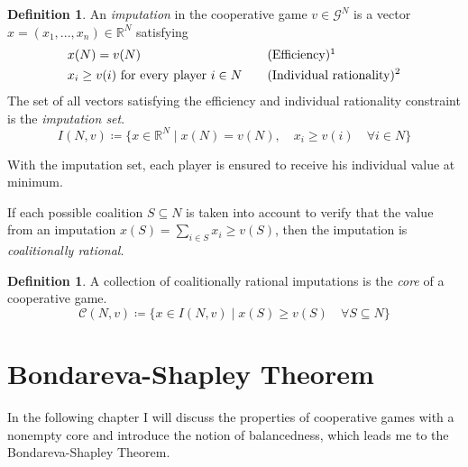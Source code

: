 \documentclass[10pt,a4paper,titlepage]{article}
\theoremstyle{plain}
\theoremstyle{definition}
\newtheorem{definition}[thm]{Definition} %
\begin{document}
\begin{definition}
    An \textit{imputation} in the cooperative game $v \in \mathcal{G}^N$ is a vector $x = (x_1, ..., x_n) \in \mathbb{R}^N$ satisfying
    \[
        \begin{aligned}
            &x(N) = v(N) && \quad \text{(Efficiency)}\footnotemark\\
            &x_i \geq v(i)\text{ for every player } i \in N && \quad \text{(Individual rationality)\footnotemark}
        \end{aligned}
    \]
    The set of all vectors satisfying the efficiency and individual rationality constraint is the \textit{imputation set}.
    \begin{equation}\label{eq:imputation}
        I(N, v) \coloneqq \{x \in \mathbb{R}^N \mid x(N) = v(N),\quad x_i \geq v(i) \quad \forall i \in N\}
    \end{equation}
\end{definition}

With the imputation set, each player is ensured to receive his individual value at minimum.

If each possible coalition $S \subseteq N$ is taken into account to verify that the value from an imputation $x(S) = \sum_{i \in S}x_i \geq v(S)$, then the imputation is \textit{coalitionally rational}.

\begin{definition}\label{def:core}
    A collection of coalitionally rational imputations is the \textit{core} of a cooperative game.
    \begin{equation}\label{eq:core}
        \mathcal{C}(N, v) \coloneqq \{x \in I(N, v) \mid x(S) \geq v(S)\quad \forall S \subseteq N\}
    \end{equation}
\end{definition}




\pagebreak
\section{Bondareva-Shapley Theorem}
In the following chapter I will discuss the properties of cooperative games with a nonempty core and introduce the notion of balancedness, which leads me to the Bondareva-Shapley Theorem.
\end{document}
